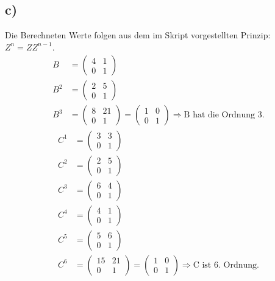 \documentclass[a4paper]{scrartcl}
\begin{document}
	\subsection{c)}
		Die Berechneten Werte folgen aus dem im Skript vorgestellten Prinzip: \(Z^n = ZZ^{n-1}\).
		\begin{align}
			B&= \begin{pmatrix}
				4&1\\0&1
			\end{pmatrix} \\
			B^2&=\begin{pmatrix}
				2&5\\0&1
			\end{pmatrix} \\
			B^3&=\begin{pmatrix}
				8&21\\0&1
			\end{pmatrix}=\begin{pmatrix}
				1&0\\0&1
			\end{pmatrix} \Rightarrow \text{B hat die Ordnung 3.}
		\end{align}
		\begin{align}
			C^1 &=\begin{pmatrix}
				3&3 \\ 0&1
			\end{pmatrix} \\
			C^2 &=\begin{pmatrix}
				2&5\\ 0&1
			\end{pmatrix} \\
			C^3 &=\begin{pmatrix}
				6&4\\ 0&1
			\end{pmatrix} \\
			C^4 &=\begin{pmatrix}
				4&1\\ 0&1
			\end{pmatrix} \\
			C^5 &=\begin{pmatrix}
				5&6\\ 0&1
			\end{pmatrix} \\
			C^6 &=\begin{pmatrix}
				15&21\\ 0&1
			\end{pmatrix} =\begin{pmatrix}
				1&0\\0&1
			\end{pmatrix} \Rightarrow \text{C ist 6. Ordnung.}
		\end{align}
\end{document}
